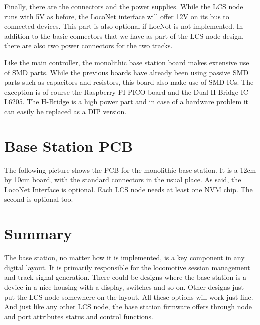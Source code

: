 
Finally, there are the connectors and the power supplies. While the LCS node runs with 5V as before, the LocoNet interface will offer 12V on its bus to connected devices. This part is also optional if LocNot is not implemented. In addition to the basic connectors that we have as part of the LCS node design, there are also two power connectors for the two tracks.


Like the main controller, the monolithic base station board makes extensive use of SMD parts. While the previous boards have already been using passive SMD parts such as capacitors and resistors, this board also make use of SMD ICs. The exception is of course the Raspberry PI PICO board and the Dual H-Bridge IC L6205. The H-Bridge is a high power part and in case of a hardware problem it can easily be replaced as a DIP version.

\section{Base Station PCB}

The following picture shows the PCB for the monolithic base station. It is a 12cm by 10cm board, with the standard connectors in the usual place. As said, the LocoNet Interface is optional. Each LCS node needs at least one NVM chip. The second is optional too.


\section{Summary}

The base station, no matter how it is implemented, is a key component in any digital layout. It is primarily responsible for the locomotive session management and track signal generation. There could be designs where the base station is a device in a nice housing with a display, switches and so on. Other designs just put the LCS node somewhere on the layout. All these options will work just fine. And just like any other LCS node, the base station firmware offers through node and port attributes status and control functions.

